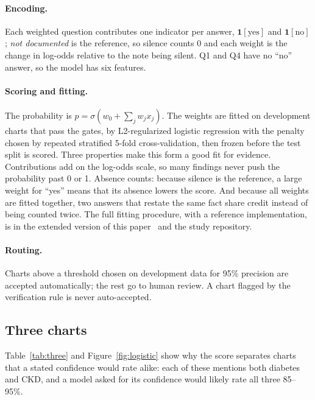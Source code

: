 \documentclass[10pt,letterpaper]{article}
\newcommand{\nd}{\textit{not documented}}
\begin{document}
\paragraph{Encoding.} Each weighted question contributes one indicator per answer, $\mathbf{1}[\text{yes}]$ and $\mathbf{1}[\text{no}]$; \nd{} is the reference, so silence counts 0 and each weight is the change in log-odds relative to the note being silent. Q1 and Q4 have no ``no'' answer, so the model has six features.

\paragraph{Scoring and fitting.} The probability is $p=\sigma(w_0+\sum_j w_j x_j)$. The weights are fitted on development charts that pass the gates, by L2-regularized logistic regression with the penalty chosen by repeated stratified 5-fold cross-validation, then frozen before the test split is scored. Three properties make this form a good fit for evidence. Contributions add on the log-odds scale, so many findings never push the probability past 0 or 1. Absence counts: because silence is the reference, a large weight for ``yes'' means that its absence lowers the score. And because all weights are fitted together, two answers that restate the same fact share credit instead of being counted twice. The full fitting procedure, with a reference implementation, is in the extended version of this paper~\cite{ewc1} and the study repository.

\paragraph{Routing.} Charts above a threshold chosen on development data for 95\% precision are accepted automatically; the rest go to human review. A chart flagged by the verification rule is never auto-accepted.

\subsection{Three charts}

Table~\ref{tab:three} and Figure~\ref{fig:logistic} show why the score separates charts that a stated confidence would rate alike: each of these mentions both diabetes and CKD, and a model asked for its confidence would likely rate all three 85--95\%.
\end{document}

